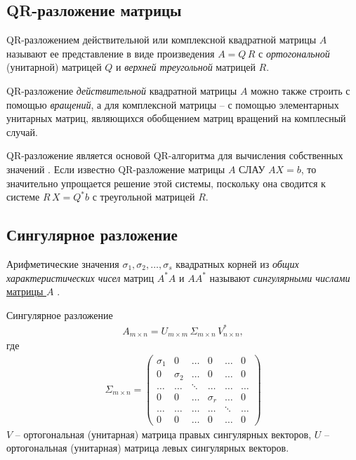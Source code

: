 \documentclass[%
	11pt,
	a4paper,
	utf8,
		]{article}
\begin{document}
\subsection{QR-разложение матрицы}

QR-разложением действительной или комплексной квадратной матрицы $ A $ называют ее представление в виде произведения $ A = Q \, R $ с \emph{ортогональной} (унитарной) матрицей $ Q $ и \emph{верхней треугольной} матрицей $ R $.

QR-разложение \emph{действительной} квадратной матрицы $ A $ можно также строить с помощью \emph{вращений}, а для комплексной матрицы -- с помощью элементарных унитарных матриц, являющихся обобщением матриц вращений на комплесный случай.

QR-разложение является основой QR-алгоритма для вычисления собственных значений \cite[]{shevtsov:linal-2012}. Если известно QR-разложение матрицы $ A $ СЛАУ $ A X = b $, то значительно упрощается решение этой системы, поскольку она сводится к системе $ R \, X = Q^* b $ с треугольной матрицей $ R $.

\subsection{Сингулярное разложение}

Арифметические значения $ \sigma_1, \sigma_2, \ldots, \sigma_s $ квадратных корней из \emph{общих характеристических чисел} матриц $ A^* A $ и $ A A^* $ называют \emph{сингулярными числами} \underline{матрицы $ A $} \cite[]{shevtsov:linal-2012}.

Сингулярное разложение
\begin{align*}
	A_{m \times n} = U_{m \times m} \, \Sigma_{m \times n} \, V_{n \times n}^*,
\end{align*}
где
\begin{align*}
	\Sigma_{m \times n} = \begin{pmatrix}
		\sigma_1 & 0 & \ldots & 0 & \ldots & 0 \\
		0 & \sigma_2 & \ldots & 0 & \ldots & 0 \\
		\ldots & \ldots & \ddots & \ldots & \ldots & \ldots \\
		0 & 0 & \ldots & \sigma_r & \ldots & 0 \\
		\ldots & \ldots & \ldots & \ldots & \ddots & \ldots \\
		0 & 0 & \ldots & 0 & \ldots & 0
	\end{pmatrix}
\end{align*}
$ V $ -- ортогональная (унитарная) матрица правых сингулярных векторов, $ U $ -- ортогональная (унитарная) матрица левых сингулярных векторов.
\end{document}
